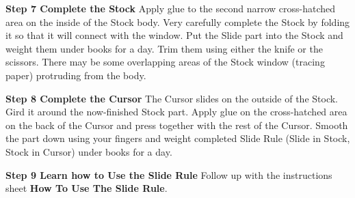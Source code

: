 \begin{multicols*}{3}
{  \textbf{Step 7 Complete the Stock} Apply glue to the second narrow cross-hatched area on the inside of the Stock body. Very carefully complete the Stock by folding it so that it will connect with the window. Put the Slide part into the Stock and weight them under books for a day.
Trim them using either the knife or the scissors.
There may be some overlapping areas of the Stock window (tracing paper) protruding from the body. 

  \textbf{Step 8 Complete the Cursor} The Cursor slides on the outside of the Stock. Gird it around the now-finished Stock part. Apply glue on the cross-hatched area on the back of the Cursor and press together with the rest of the Cursor. Smooth the part down using your fingers and weight completed Slide Rule (Slide in Stock, Stock in Cursor) under books for a day.

  \textbf{Step 9 Learn how to Use the Slide Rule} Follow up with the instructions sheet \textbf{How To Use The Slide Rule}.

  }
  \end{multicols*}
  

